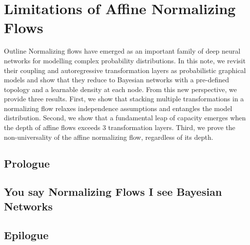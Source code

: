 \chapter{Limitations of Affine Normalizing Flows}\label{ch:04}

\begin{remark}{Outline}
Normalizing flows have emerged as an important family of deep neural networks for modelling complex probability distributions.
In this note, we revisit their coupling and autoregressive transformation layers as probabilistic graphical models and show that they reduce to Bayesian networks  with a pre-defined topology and a learnable density at each node.
From this new perspective, we provide three results.
First, we show that stacking multiple transformations in a normalizing flow relaxes independence assumptions and entangles the model distribution.
Second, we show that a fundamental leap of capacity emerges when the depth of affine flows exceeds 3 transformation layers.
Third, we prove the non-universality of the affine normalizing flow, regardless of its depth.
\end{remark}

\section{Prologue}

\section{You say Normalizing Flows I see Bayesian Networks}


\section{Epilogue}

